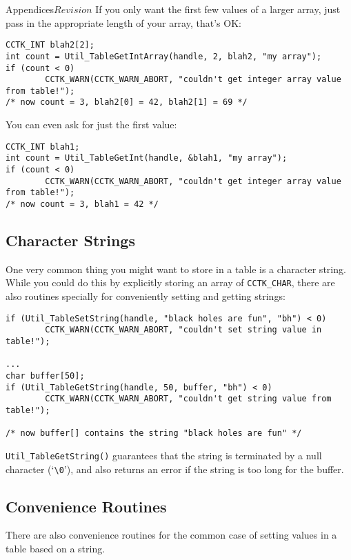 \begin{cactuspart}{Appendices}{}{$Revision$}
If you only want the first few values of a larger array, just pass
in the appropriate length of your array,
that's OK:
\begin{verbatim}
CCTK_INT blah2[2];
int count = Util_TableGetIntArray(handle, 2, blah2, "my array");
if (count < 0)
        CCTK_WARN(CCTK_WARN_ABORT, "couldn't get integer array value from table!");
/* now count = 3, blah2[0] = 42, blah2[1] = 69 */
\end{verbatim}
You can even ask for just the first value:
\begin{verbatim}
CCTK_INT blah1;
int count = Util_TableGetInt(handle, &blah1, "my array");
if (count < 0)
        CCTK_WARN(CCTK_WARN_ABORT, "couldn't get integer array value from table!");
/* now count = 3, blah1 = 42 */
\end{verbatim}


\subsection{Character Strings}

One very common thing you might want to store in a table is a
character string.  While you could do this by explicitly storing
an array of \verb|CCTK_CHAR|, there are also routines
specially for conveniently setting and getting strings:
\begin{verbatim}
if (Util_TableSetString(handle, "black holes are fun", "bh") < 0)
        CCTK_WARN(CCTK_WARN_ABORT, "couldn't set string value in table!");

...
char buffer[50];
if (Util_TableGetString(handle, 50, buffer, "bh") < 0)
        CCTK_WARN(CCTK_WARN_ABORT, "couldn't get string value from table!");

/* now buffer[] contains the string "black holes are fun" */
\end{verbatim}

\verb|Util_TableGetString()| guarantees that the string is
terminated by a null character (`\verb|\0|'), and also returns an
error if the string is too long for the buffer.


\subsection{Convenience Routines}

There are also convenience routines for the common case of setting
values in a table based on a string.


\end{cactuspart}
